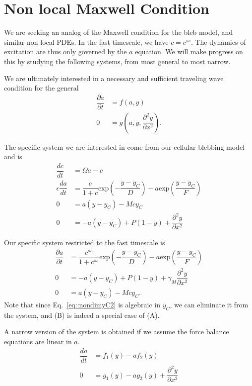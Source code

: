 \section{Non local Maxwell Condition}



We are seeking an analog of the Maxwell condition for the bleb model, and similar non-local PDEs. In the fast timescale, we have $c = c^{ss}$.  The dynamics of excitation are thus only governed by the $a$ equation. We will make progress on this by studying the following systems, from most general to most narrow.

We are ultimately interested in a necessary and sufficient traveling wave condition for the general
\begin{align}
\dfrac{\partial a}{ \partial t}  & =  f(a,y)\\
0 & =g \left(a,y,\dfrac{\partial^2 y}{\partial x^2}\right).
\end{align}

The specific system we are interested in come from our cellular blebbing model and is
\begin{align}
\dfrac{dc}{dt}  & =  \Omega a - c\label{eq::nondimc}\\
\epsilon\dfrac{da}{ dt}  & =  \dfrac{c}{1+c} \mbox{exp}\left(-\dfrac{y-y_C}{D}\right) - a \mbox{exp} \left(\dfrac{y-y_C}{F} \right)\label{eq::nondima}\\
0 & = a(y-y_C) - Mcy_C\label{eq::nondimyC}\\
0 & = -a(y - y_C) + P (1-y) + \dfrac{\partial^2 y}{\partial x^2}\label{eq::nondimyM}
\end{align}

Our specific system restricted to the fast timescale is
\begin{align}
\dfrac{\partial a}{ \partial t}  & =  \dfrac{c^{ss}}{1+c^{ss}} \mbox{exp}\left(-\dfrac{y-y_C}{D}\right) - a \mbox{exp} \left(\dfrac{y-y_C}{F} \right)\label{eq::a_ODE}\\
0 & = -a(y - y_C) + P (1-y) + \gamma_M \dfrac{\partial^2 y}{\partial x^2}\label{eq::yM_eq} \\
0 & = a(y-y_C) - Mcy_C\label{eq::nondimyC2}.
\end{align} 
Note that since Eq.~\ref{eq::nondimyC2} is algebraic in $y_C$, we can eliminate it from the system, and (B) is indeed a special case of (A). 

A narrow version of the system is obtained if we assume the force balance equations are linear in $a$.
\begin{align}
\dfrac{da}{ dt}  & = f_1(y) - a f_2(y)\label{eq::gen_a}\\
0 & = g_1(y) - ag_2(y) +  \dfrac{\partial^2 y}{\partial x^2}\label{eq::gen_ym}
\end{align}


